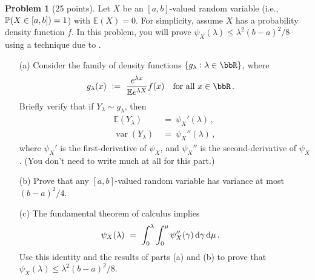 \documentclass[11pt]{article}
\newcommand{\E}{\ensuremath{\mathbb{E}}} %
\renewcommand{\P}{\ensuremath{\mathbb{P}}} %
\newcommand{\var}{\ensuremath{\operatorname{var}}} %
\newcommand{\logmgf}[1]{\ensuremath{\psi_{#1}}} %
\theoremstyle{definition}
\newtheorem{problem}{Problem}
\begin{document}
\begin{problem}[25 points]
  Let $X$ be an $[a,b]$-valued random variable (i.e., $\P(X\in\intcc{a,b})=1$) with $\E(X) = 0$.
  For simplicity, assume $X$ has a probability density function $f$.
  In this problem, you will prove $\logmgf{X}(\lambda) \leq \lambda^2(b-a)^2/8$ using a technique due to \citet{McAllesterO03}.
  \begin{enumerate}
    \item[(a)]
      Consider the family of density functions $\{ g_\lambda : \lambda \in \bbR \}$, where
      \begin{align*}
        g_\lambda(x) & \ := \ \frac{e^{\lambda x}}{\E e^{\lambda X}} f(x)
        \quad \text{for all $x \in \bbR$} \,.
      \end{align*}
      Briefly verify that if $Y_\lambda \sim g_\lambda$, then
      \begin{align*}
        \E(Y_\lambda) & \ = \ \logmgf{X}'(\lambda)
        \,,
        \\
        \var(Y_\lambda) & \ = \ \logmgf{X}''(\lambda)
        \,,
      \end{align*}
      where $\logmgf{X}'$ is the first-derivative of $\logmgf{X}$, and $\logmgf{X}''$ is the second-derivative of $\logmgf{X}$.
      (You don't need to write much at all for this part.)

    \item[(b)]
      Prove that any $[a,b]$-valued random variable has variance at most $(b-a)^2/4$.

    \item[(c)]
      The fundamental theorem of calculus implies
      \begin{align*}
        \logmgf{X}(\lambda)
        & \ = \
        \int_0^\lambda \int_0^\mu \logmgf{X}''(\gamma) \dif\gamma \dif\mu
        \,.
      \end{align*}
      Use this identity and the results of parts (a) and (b) to prove that
      $\logmgf{X}(\lambda) \leq \lambda^2 (b-a)^2/8$.

  \end{enumerate}
\end{problem}
\end{document}
